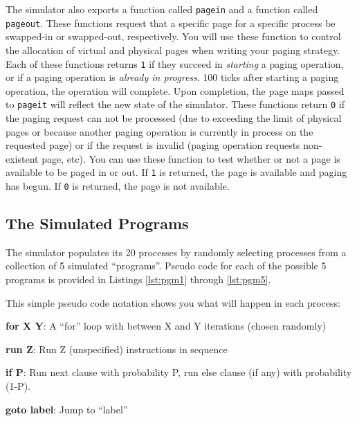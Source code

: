 \documentclass[12pt]{article}
\newenvironment{packed_item}{
\begin{itemize}
  \setlength{\itemsep}{1pt}
  \setlength{\parskip}{0pt}
  \setlength{\parsep}{0pt}
}{\end{itemize}}
\begin{document}
The simulator also exports a function called \texttt{pagein} and a
function called \texttt{pageout}. These functions request that a
specific page for a specific process be swapped-in or swapped-out,
respectively. You will use these function to control the allocation of
virtual and physical pages when writing your paging strategy. Each of
these functions returns \texttt{1} if they succeed in \emph{starting} a
paging operation, or if a paging operation is \emph{already in
  progress}. 100 ticks after starting a paging operation, the
operation will complete. Upon completion, the page maps passed
to \texttt{pageit}
will reflect the new state of the simulator. These functions return
\texttt{0} if the paging request can not be processed (due to
exceeding the limit of physical pages or because another paging
operation is currently in process on the requested page) or if the
request is invalid (paging operation requests non-existent page,
etc). You can use these function to test whether or not a page is
available to be paged in or out.
If \texttt{1} is returned, the page is available
and paging has begun. If \texttt{0} is returned, the page is not
available.

\subsection {The Simulated Programs}

The simulator populates its 20 processes by randomly selecting processes
from a collection of 5 simulated ``programs''. Pseudo code for each of
the possible 5 programs is provided in Listings \ref{lst:pgm1} through
\ref{lst:pgm5}.











This simple pseudo code notation shows you what will happen in each
process:
\begin{packed_item}
\item {\bf for X Y}: A ``for'' loop with between X and Y iterations
  (chosen randomly)
\item {\bf run Z}: Run Z (unspecified) instructions in sequence
\item {\bf if P}: Run next clause with probability P,
  run else clause (if any) with probability (1-P).
\item {\bf goto label}: Jump to ``label''
\end{packed_item}
\end{document}

